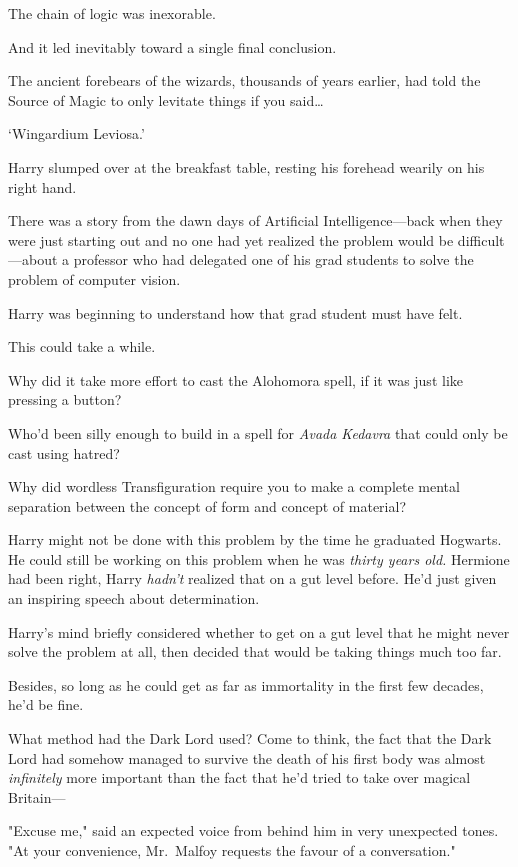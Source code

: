 The chain of logic was inexorable.

And it led inevitably toward a single final conclusion.

The ancient forebears of the wizards, thousands of years earlier, had told the
Source of Magic to only levitate things if you said{\ldots}

`Wingardium Leviosa.'

Harry slumped over at the breakfast table, resting his forehead wearily on his
right hand.

There was a story from the dawn days of Artificial Intelligence---back when
they were just starting out and no one had yet realized the problem would be
difficult---about a professor who had delegated one of his grad students to
solve the problem of computer vision.

Harry was beginning to understand how that grad student must have felt.

This could take a while.

Why did it take more effort to cast the Alohomora spell, if it was just like
pressing a button?

Who'd been silly enough to build in a spell for \emph{Avada Kedavra} that could
only be cast using hatred?

Why did wordless Transfiguration require you to make a complete mental
separation between the concept of form and concept of material?

Harry might not be done with this problem by the time he graduated Hogwarts. He
could still be working on this problem when he was \emph{thirty years old.}
Hermione had been right, Harry \emph{hadn't} realized that on a gut level
before. He'd just given an inspiring speech about determination.

Harry's mind briefly considered whether to get on a gut level that he might
never solve the problem at all, then decided that would be taking things much
too far.

Besides, so long as he could get as far as immortality in the first few
decades, he'd be fine.

What method had the Dark Lord used? Come to think, the fact that the Dark Lord
had somehow managed to survive the death of his first body was almost
\emph{infinitely} more important than the fact that he'd tried to take over
magical Britain---

"Excuse me," said an expected voice from behind him in very unexpected tones.
"At your convenience, Mr.~Malfoy requests the favour of a conversation."

